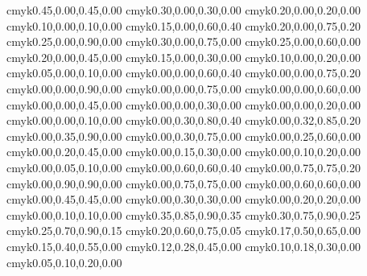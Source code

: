 \definecolor{lightgreen}          {cmyk}{0.45,0.00,0.45,0.00}
\definecolor{verylightgreen}      {cmyk}{0.30,0.00,0.30,0.00}
\definecolor{palegreen}           {cmyk}{0.20,0.00,0.20,0.00}
\definecolor{verypalegreen}       {cmyk}{0.10,0.00,0.10,0.00}
\definecolor{verydeeplimegreen}   {cmyk}{0.15,0.00,0.60,0.40}
\definecolor{deeplimegreen}       {cmyk}{0.20,0.00,0.75,0.20}
\definecolor{verydarklimegreen}   {cmyk}{0.25,0.00,0.90,0.00}
\definecolor{darklimegreen}       {cmyk}{0.30,0.00,0.75,0.00}
\definecolor{limegreen}           {cmyk}{0.25,0.00,0.60,0.00}
\definecolor{lightlimegreen}      {cmyk}{0.20,0.00,0.45,0.00}
\definecolor{verylightlimegreen}  {cmyk}{0.15,0.00,0.30,0.00}
\definecolor{palelimegreen}       {cmyk}{0.10,0.00,0.20,0.00}
\definecolor{verypalelimegreen}   {cmyk}{0.05,0.00,0.10,0.00}
\definecolor{verydeepyellow}      {cmyk}{0.00,0.00,0.60,0.40}
\definecolor{deepyellow}          {cmyk}{0.00,0.00,0.75,0.20}
\definecolor{verydarkyellow}      {cmyk}{0.00,0.00,0.90,0.00}
\definecolor{darkyellow}          {cmyk}{0.00,0.00,0.75,0.00}
\definecolor{yellow}              {cmyk}{0.00,0.00,0.60,0.00}
\definecolor{lightyellow}         {cmyk}{0.00,0.00,0.45,0.00}
\definecolor{verylightyellow}     {cmyk}{0.00,0.00,0.30,0.00}
\definecolor{paleyellow}          {cmyk}{0.00,0.00,0.20,0.00}
\definecolor{verypaleyellow}      {cmyk}{0.00,0.00,0.10,0.00}
\definecolor{verydeeporange}      {cmyk}{0.00,0.30,0.80,0.40}
\definecolor{deeporange}          {cmyk}{0.00,0.32,0.85,0.20}
\definecolor{verydarkorange}      {cmyk}{0.00,0.35,0.90,0.00}
\definecolor{darkorange}          {cmyk}{0.00,0.30,0.75,0.00}
\definecolor{orange}              {cmyk}{0.00,0.25,0.60,0.00}
\definecolor{lightorange}         {cmyk}{0.00,0.20,0.45,0.00}
\definecolor{verylightorange}     {cmyk}{0.00,0.15,0.30,0.00}
\definecolor{paleorange}          {cmyk}{0.00,0.10,0.20,0.00}
\definecolor{verypaleorange}      {cmyk}{0.00,0.05,0.10,0.00}
\definecolor{verydeepred}         {cmyk}{0.00,0.60,0.60,0.40}
\definecolor{deepred}             {cmyk}{0.00,0.75,0.75,0.20}
\definecolor{verydarkred}         {cmyk}{0.00,0.90,0.90,0.00}
\definecolor{darkred}             {cmyk}{0.00,0.75,0.75,0.00}
\definecolor{red}                 {cmyk}{0.00,0.60,0.60,0.00}
\definecolor{lightred}            {cmyk}{0.00,0.45,0.45,0.00}
\definecolor{verylightred}        {cmyk}{0.00,0.30,0.30,0.00}
\definecolor{palered}             {cmyk}{0.00,0.20,0.20,0.00}
\definecolor{verypalered}         {cmyk}{0.00,0.10,0.10,0.00}
\definecolor{verydeepbrown}       {cmyk}{0.35,0.85,0.90,0.35}
\definecolor{deepbrown}           {cmyk}{0.30,0.75,0.90,0.25}
\definecolor{verydarkbrown}       {cmyk}{0.25,0.70,0.90,0.15}
\definecolor{darkbrown}           {cmyk}{0.20,0.60,0.75,0.05}
\definecolor{brown}               {cmyk}{0.17,0.50,0.65,0.00}
\definecolor{lightbrown}          {cmyk}{0.15,0.40,0.55,0.00}
\definecolor{verylightbrown}      {cmyk}{0.12,0.28,0.45,0.00}
\definecolor{palebrown}           {cmyk}{0.10,0.18,0.30,0.00}
\definecolor{verypalebrown}       {cmyk}{0.05,0.10,0.20,0.00}
